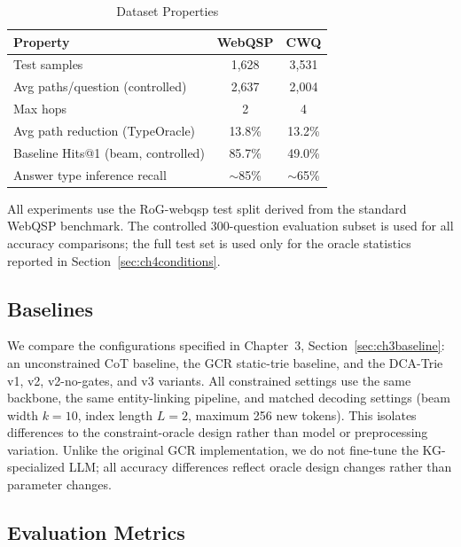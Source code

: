 \begin{table}[H]
  \centering
  \caption[Dataset Properties]{Dataset Properties}
  \label{tab:datasets}
  \begin{tabularx}{\textwidth}{|X|c|c|}
    \hline
    \textbf{Property}                    & \textbf{WebQSP} & \textbf{CWQ} \\
    \hline
    Test samples                         & 1,628           & 3,531         \\
    Avg paths/question (controlled)      & 2,637           & 2,004         \\
    Max hops                             & 2               & 4             \\
    Avg path reduction (TypeOracle)      & 13.8\%          & 13.2\%        \\
    Baseline Hits@1 (beam, controlled)   & 85.7\%          & 49.0\%        \\
    Answer type inference recall         & $\sim$85\%      & $\sim$65\%    \\
    \hline
  \end{tabularx}
\end{table}

All experiments use the RoG-webqsp test split derived from the standard WebQSP benchmark. The controlled 300-question evaluation subset is used for all accuracy comparisons; the full test set is used only for the oracle statistics reported in Section~\ref{sec:ch4conditions}.

\subsection{Baselines}
\label{sec:ch4baselines}

We compare the configurations specified in Chapter~3, Section~\ref{sec:ch3baseline}: an unconstrained CoT baseline, the GCR static-trie baseline, and the DCA-Trie v1, v2, v2-no-gates, and v3 variants. All constrained settings use the same \modelname{} backbone, the same entity-linking pipeline, and matched decoding settings (beam width $k=10$, index length $L=2$, maximum 256 new tokens). This isolates differences to the constraint-oracle design rather than model or preprocessing variation. Unlike the original GCR implementation, we do not fine-tune the KG-specialized LLM; all accuracy differences reflect oracle design changes rather than parameter changes.

\subsection{Evaluation Metrics}
\label{sec:ch4metrics}

